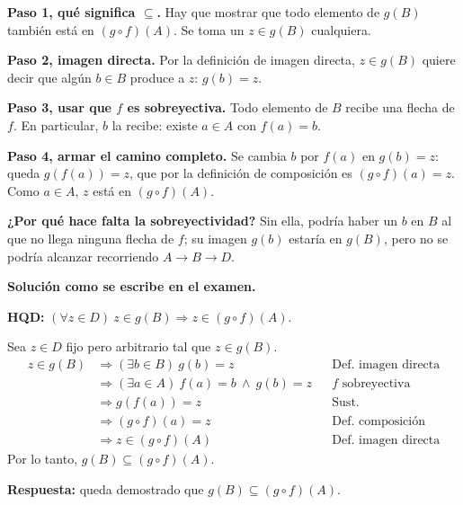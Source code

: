\documentclass[11pt]{article}
\begin{document}

\begin{explica}
\textbf{Paso 1, qué significa $\subseteq$.} Hay que mostrar que todo elemento de $g(B)$ también está en $(g\circ f)(A)$. Se toma un $z\in g(B)$ cualquiera.

\textbf{Paso 2, imagen directa.} Por la definición de imagen directa, $z\in g(B)$ quiere decir que algún $b\in B$ produce a $z$: $g(b)=z$.

\textbf{Paso 3, usar que $f$ es sobreyectiva.} Todo elemento de $B$ recibe una flecha de $f$. En particular, $b$ la recibe: existe $a\in A$ con $f(a)=b$.

\textbf{Paso 4, armar el camino completo.} Se cambia $b$ por $f(a)$ en $g(b)=z$: queda $g(f(a))=z$, que por la definición de composición es $(g\circ f)(a)=z$. Como $a\in A$, $z$ está en $(g\circ f)(A)$.

\textbf{¿Por qué hace falta la sobreyectividad?} Sin ella, podría haber un $b$ en $B$ al que no llega ninguna flecha de $f$; su imagen $g(b)$ estaría en $g(B)$, pero no se podría alcanzar recorriendo $A\to B\to D$.
\end{explica}

\textbf{Solución como se escribe en el examen.}

\textbf{HQD:} $(\forall z\in D)\ z\in g(B)\Rightarrow z\in(g\circ f)(A)$.

Sea $z\in D$ fijo pero arbitrario tal que $z\in g(B)$.
\begin{align*}
z\in g(B)&\Rightarrow(\exists b\in B)\ g(b)=z && \text{Def. imagen directa}\\
&\Rightarrow(\exists a\in A)\ f(a)=b\ \wedge\ g(b)=z && f\text{ sobreyectiva}\\
&\Rightarrow g(f(a))=z && \text{Sust.}\\
&\Rightarrow (g\circ f)(a)=z && \text{Def. composición}\\
&\Rightarrow z\in(g\circ f)(A) && \text{Def. imagen directa}
\end{align*}
Por lo tanto, $g(B)\subseteq(g\circ f)(A)$.

\textbf{Respuesta:} queda demostrado que $g(B)\subseteq(g\circ f)(A)$.
\end{document}
